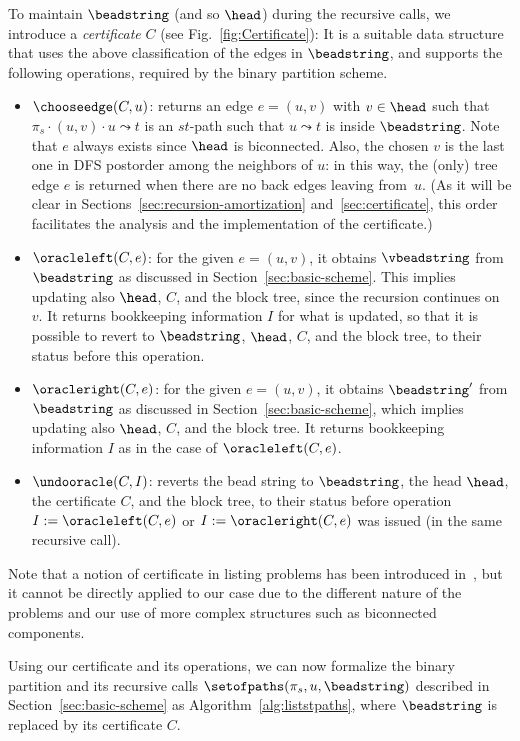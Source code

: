 To maintain $\beadstring$ (and so $\head$) during the recursive calls,
we introduce a \emph{certificate} $C$ (see Fig.~\ref{fig:Certificate}): It is a suitable data structure that uses the above
classification of the edges in $\beadstring$, and supports the
following operations, required by the binary partition scheme.
\begin{itemize}
\item $\chooseedge(C,u)$: returns an edge $e = (u,v)$ with $v \in
	\head$ such that $\pi_s \cdot (u,v) \cdot u \leadsto t$ is an
	$st$-path such that $u \leadsto t$ is inside $\beadstring$.
	Note that $e$ always exists since $\head$ is biconnected.
	Also, the chosen $v$ is the last one in DFS postorder among the
	neighbors of $u$: in this way, the (only) tree edge $e$ is
	returned when there are no back edges leaving from~$u$.  (As
	it will be clear in Sections~\ref{sec:recursion-amortization}
	and~\ref{sec:certificate}, this order facilitates the analysis
	and the implementation of the certificate.)
\item $\oracleleft(C,e)$: for the given $e=(u,v)$, it obtains
	$\vbeadstring$ from $\beadstring$ as discussed in
	Section~\ref{sec:basic-scheme}. This implies updating also
	$\head$, $C$, and the block tree, since the recursion
	continues on~$v$. It returns bookkeeping information $I$ for
	what is updated, so that it is possible to revert to
	$\beadstring$, $\head$, $C$, and the block tree, to their
	status before this operation.
\item $\oracleright(C,e)$: for the given $e=(u,v)$, it obtains
	$\beadstring'$ from $\beadstring$ as discussed in
	Section~\ref{sec:basic-scheme}, which implies updating also
	$\head$, $C$, and the block tree. It returns bookkeeping
	information $I$ as in the case of $\oracleleft(C,e)$.
\item $\undooracle(C,I)$: reverts the bead string to $\beadstring$,
	the head $\head$, the certificate $C$, and the block tree, to
	their status before operation $I := \oracleleft(C,e)$ or $I :=
	\oracleright(C,e)$ was issued (in the same recursive call).
\end{itemize}

Note that a notion of certificate in listing problems has been
introduced in~\cite{Ferreira11}, but it cannot be directly applied to
our case due to the different nature of the problems and our use of more
complex structures such as biconnected components. 

Using our certificate
and its operations, we can now formalize the binary partition and its
recursive calls $\setofpaths(\pi_s, u, \beadstring)$ described in
Section~\ref{sec:basic-scheme} as Algorithm~\ref{alg:liststpaths},
where $\beadstring$ is replaced by its certificate $C$.

